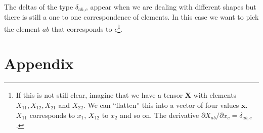 \documentclass{article}
\begin{document}
The deltas of the type \(\delta_{ab,c}\) appear when we are dealing with different shapes but there is still a one to one correspondence of elements. In this case we want to pick the element \(ab\) that corresponds to \(c\)\footnote{If this is not still clear, imagine that we have a tensor \(\mathbf{X}\) with elements \(X_{11}, X_{12}, X_{21}\) and \(X_{22}\). We can ``flatten'' this into a vector of four values \(\mathbf{x}\). \(X_{11}\) corresponds to \(x_1\), \(X_{12}\) to \(x_2\) and so on. The derivative \(\partial X_{ab} / \partial x_c = \delta_{ab, c}\).}.

\pagebreak %

\appendix
\section{Appendix}
\end{document}
